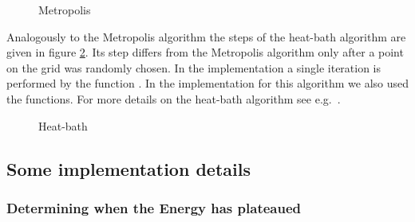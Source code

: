 \begin{figure}
\centering
\begin{algorithm}[H]
\caption{Metropolis}
\label{alg:Metropolis}

\BlankLine
{}
\end{algorithm}
\end{figure}

Analogously to the Metropolis algorithm the steps of the heat-bath algorithm are given in figure \ref{alg:heat-bath}. Its step differs from the Metropolis algorithm only after a point on the grid was randomly chosen. In the implementation a single iteration is performed by the function . In the implementation for this algorithm we also used the  functions. For more details on the heat-bath algorithm see e.g.\  \cite{AndersIrsb2}.

\begin{figure}
\centering
\begin{algorithm}[H]
\caption{Heat-bath}
\label{alg:heat-bath}

\BlankLine
{}
\end{algorithm}
\end{figure}

\subsection{Some implementation details}

\subsubsection{Determining when the Energy has plateaued}

